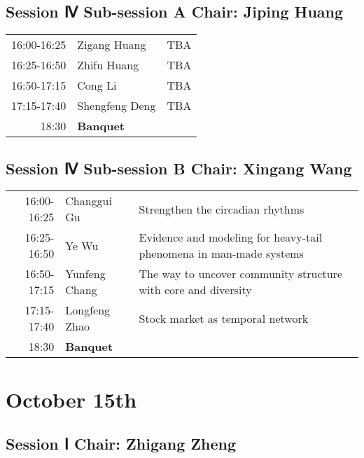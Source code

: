\documentclass[11pt]{article}
\begin{document}
\subsection*{Session Ⅳ Sub-session A  Chair: Jiping Huang}
\label{sec:orgc20c8e9}

\begin{center}
\begin{tabular}{rll}
\hline
16:00-16:25 & Zigang Huang & TBA\\
16:25-16:50 & Zhifu Huang & TBA\\
16:50-17:15 & Cong Li & TBA\\
17:15-17:40 & Shengfeng Deng & TBA\\
      18:30 &  \textbf{Banquet} & \\
\hline
\end{tabular}
\end{center}


\subsection*{Session Ⅳ Sub-session B  Chair: Xingang Wang}
\label{sec:orgd26fd09}

\begin{center}
\begin{tabular}{rll}
\hline
16:00-16:25 & Changgui Gu & Strengthen the circadian rhythms\\
16:25-16:50 & Ye Wu & Evidence and modeling for heavy-tail phenomena in man-made systems\\
16:50-17:15 & Yunfeng Chang & The way to uncover community structure with core and diversity\\
17:15-17:40 & Longfeng  Zhao & Stock market as temporal network\\
 18:30 &  \textbf{Banquet} & \\
\hline
\end{tabular}
\end{center}

\newpage

\section*{October 15th}
\label{sec:org11e8363}


\subsection*{Session Ⅰ Chair: Zhigang Zheng}
\label{sec:orga1aa2b0}
\end{document}
